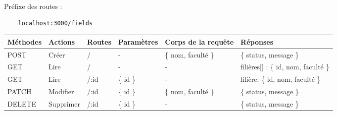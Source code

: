 Préfixe des routes :
\begin{lstlisting}
    localhost:3000/fields
\end{lstlisting}

\begin{center}
    \begin{tabularx}{1\textwidth} {
            | >{\raggedright\arraybackslash}X
            | >{\centering\arraybackslash}X
            | >{\centering\arraybackslash}X
            | >{\centering\arraybackslash}X
            | >{\centering\arraybackslash}X
            | >{\raggedleft\arraybackslash}X |
        }
        \hline
            Méthodes & Actions & Routes & Paramètres & Corps de la requête & Réponses \\
        \hline
            POST  & Créer & / &  - & \{ nom, faculté \} & \{ status, message \} \\
        \hline
            GET  & Lire &  / & - & - & filières[] : \{ id, nom, faculté \}  \\
        \hline
            GET  & Lire & /:id & \{ id \} & - & filière: \{ id, nom, faculté \} \\
        \hline
            PATCH  & Modifier & /:id & \{ id \} & \{ nom, faculté \} & \{ status, message \} \\
        \hline
            DELETE & Supprimer  & /:id & \{ id \} & - & \{ status, message \} \\
        \hline
    \end{tabularx}
\end{center}
\pagebreak